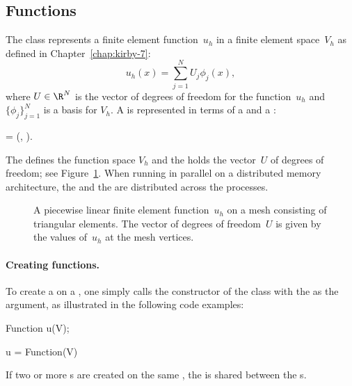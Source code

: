 \subsection{Functions}

The  class represents a finite element
function~$u_h$ in a finite element space~$V_h$ as defined in
Chapter~\ref{chap:kirby-7}:
\begin{equation}
  u_h(x) = \sum_{j=1}^N U_j \phi_j(x),
\end{equation}
where $U \in \R^N$ is the vector of degrees of freedom for the
function~$u_h$ and $\{\phi_j\}_{j=1}^N$ is a basis for $V_h$.  A
 is represented in terms of a  and a
:
\vspace{0.2cm}
\begin{center}
   = (,\; ).
\end{center}
\vspace{0.2cm}
The  defines the function space $V_h$ and the
 holds the vector~$U$ of degrees of freedom; see
Figure~\ref{fig:logg-2:femsolution}. When running in parallel on a
distributed memory architecture, the  and the
 are distributed across the processes.

\begin{figure}
  \center{}
  \caption{A piecewise linear finite element function~$u_h$ on a
    mesh consisting of triangular elements. The vector of degrees of
    freedom~$U$ is given by the values of~$u_h$ at the mesh
    vertices.}
  \label{fig:logg-2:femsolution}
\end{figure}

\paragraph{Creating functions.}

To create a  on a , one simply calls
the constructor of the  class with the 
as the argument, as illustrated in the following code examples:
\begin{c++}
Function u(V);
\end{c++}
\begin{python}
u = Function(V)
\end{python}
If two or more s are created on the same
, the  is shared between the
s.

